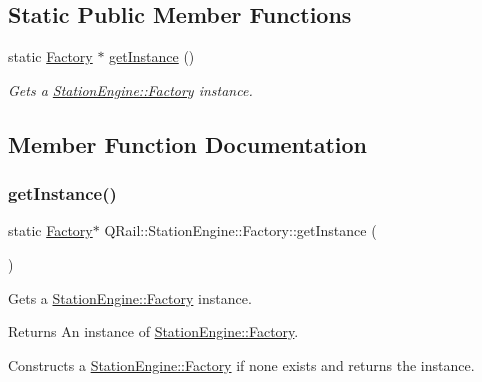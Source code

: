 \subsection*{Static Public Member Functions}
\begin{DoxyCompactItemize}
\item 
static \mbox{\hyperlink{classQRail_1_1StationEngine_1_1Factory}{Factory}} $\ast$ \mbox{\hyperlink{classQRail_1_1StationEngine_1_1Factory_ac66b314d8a7787511a6677a24ab321ff}{get\+Instance}} ()
\begin{DoxyCompactList}\small\item\em Gets a \mbox{\hyperlink{classQRail_1_1StationEngine_1_1Factory}{Station\+Engine\+::\+Factory}} instance. \end{DoxyCompactList}\end{DoxyCompactItemize}


\subsection{Member Function Documentation}
\mbox{\label{classQRail_1_1StationEngine_1_1Factory_ac66b314d8a7787511a6677a24ab321ff}} 
\subsubsection{\texorpdfstring{getInstance()}{getInstance()}}
{\footnotesize\ttfamily static \mbox{\hyperlink{classQRail_1_1StationEngine_1_1Factory}{Factory}}$\ast$ Q\+Rail\+::\+Station\+Engine\+::\+Factory\+::get\+Instance (\begin{DoxyParamCaption}{ }\end{DoxyParamCaption})\hspace{0.3cm}{\ttfamily [static]}}



Gets a \mbox{\hyperlink{classQRail_1_1StationEngine_1_1Factory}{Station\+Engine\+::\+Factory}} instance. 

\begin{DoxyReturn}{Returns}
An instance of \mbox{\hyperlink{classQRail_1_1StationEngine_1_1Factory}{Station\+Engine\+::\+Factory}}.
\end{DoxyReturn}
Constructs a \mbox{\hyperlink{classQRail_1_1StationEngine_1_1Factory}{Station\+Engine\+::\+Factory}} if none exists and returns the instance. \mbox{\label{classQRail_1_1StationEngine_1_1Factory_a385cbfbc2697c39bd2c09b866bdfd4ac}} 
